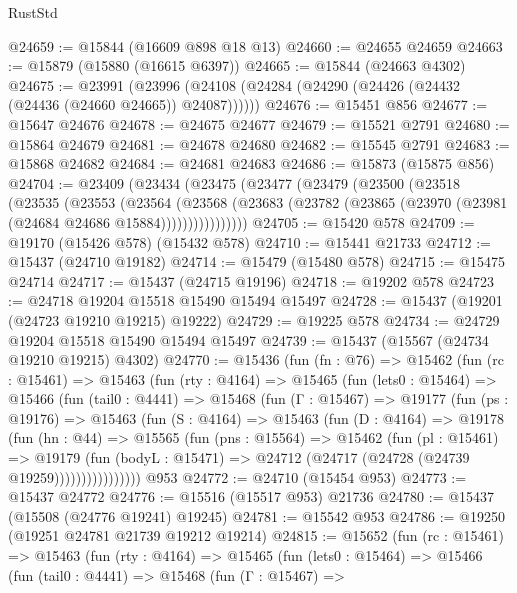 \begin{lexlean}{RustStd}
\begin{coremodule}
@24659 := @15844 (@16609 @898 @18 @13)
@24660 := @24655 @24659
@24663 := @15879 (@15880 (@16615 @6397))
@24665 := @15844 (@24663 @4302)
@24675 := @23991
    (@23996 (@24108 (@24284 (@24290 (@24426 (@24432 (@24436 (@24660 @24665)) @24087))))))
@24676 := @15451 @856
@24677 := @15647 @24676
@24678 := @24675 @24677
@24679 := @15521 @2791
@24680 := @15864 @24679
@24681 := @24678 @24680
@24682 := @15545 @2791
@24683 := @15868 @24682
@24684 := @24681 @24683
@24686 := @15873 (@15875 @856)
@24704 := @23409
    (@23434
      (@23475
        (@23477
          (@23479
            (@23500
              (@23518
                (@23535
                  (@23553
                    (@23564
                      (@23568
                        (@23683
                          (@23782 (@23865 (@23970 (@23981 (@24684 @24686 @15884))))))))))))))))
@24705 := @15420 @578
@24709 := @19170 (@15426 @578) (@15432 @578)
@24710 := @15441 @21733
@24712 := @15437 (@24710 @19182)
@24714 := @15479 (@15480 @578)
@24715 := @15475 @24714
@24717 := @15437 (@24715 @19196)
@24718 := @19202 @578
@24723 := @24718 @19204 @15518 @15490 @15494 @15497
@24728 := @15437 (@19201 (@24723 @19210 @19215) @19222)
@24729 := @19225 @578
@24734 := @24729 @19204 @15518 @15490 @15494 @15497
@24739 := @15437 (@15567 (@24734 @19210 @19215) @4302)
@24770 := @15436
    (fun (fn : @76) =>
    @15462
      (fun (rc : @15461) =>
      @15463
        (fun (rty : @4164) =>
        @15465
          (fun (lets0 : @15464) =>
          @15466
            (fun (tail0 : @4441) =>
            @15468
              (fun (Γ : @15467) =>
              @19177
                (fun (ps : @19176) =>
                @15463
                  (fun (S : @4164) =>
                  @15463
                    (fun (D : @4164) =>
                    @19178
                      (fun (hn : @44) =>
                      @15565
                        (fun (pns : @15564) =>
                        @15462
                          (fun (pl : @15461) =>
                          @19179
                            (fun (bodyL : @15471) =>
                            @24712 (@24717 (@24728 (@24739 @19259))))))))))))))))
    @953
@24772 := @24710 (@15454 @953)
@24773 := @15437 @24772
@24776 := @15516 (@15517 @953) @21736
@24780 := @15437 (@15508 (@24776 @19241) @19245)
@24781 := @15542 @953
@24786 := @19250 (@19251 @24781 @21739 @19212 @19214)
@24815 := @15652
    (fun (rc : @15461) =>
    @15463
      (fun (rty : @4164) =>
      @15465
        (fun (lets0 : @15464) =>
        @15466
          (fun (tail0 : @4441) =>
          @15468
            (fun (Γ : @15467) =>

\end{coremodule}
\end{lexlean}
